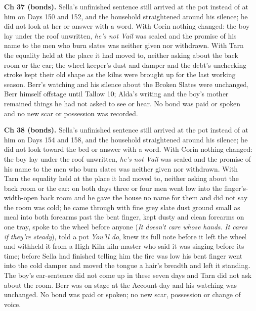 \documentclass{design/chronicle}
\begin{document}
{\textbf{Ch 37 (bonds).} Sella’s unfinished sentence still arrived at the pot instead of at him on Days 150 and 152, and the household straightened around his silence; he did not look at her or answer with a word. With Corin nothing changed: the boy lay under the roof unwritten, \emph{he’s not Vail} was sealed and the promise of his name to the men who burn slates was neither given nor withdrawn. With Tarn the equality held at the place it had moved to, neither asking about the back room or the ear; the wheel-keeper’s dust and damper and the debt’s unchecking stroke kept their old shape as the kilns were brought up for the last working season. Berr’s watching and his silence about the Broken Slates were unchanged, Berr himself offstage until Tallow 10; Alda’s writing and the boy’s mother remained things he had not asked to see or hear. No bond was paid or spoken and no new scar or possession was recorded.

\textbf{Ch 38 (bonds).} Sella’s unfinished sentence still arrived at the pot instead of at him on Days 154 and 158, and the household straightened around his silence; he did not look toward the bed or answer with a word. With Corin nothing changed: the boy lay under the roof unwritten, \emph{he’s not Vail} was sealed and the promise of his name to the men who burn slates was neither given nor withdrawn. With Tarn the equality held at the place it had moved to, neither asking about the back room or the ear: on both days three or four men went low into the finger’s-width-open back room and he gave the house no name for them and did not say the room was cold; he came through with fine grey slate dust ground small as meal into both forearms past the bent finger, kept dusty and clean forearms on one tray, spoke to the wheel before anyone (\emph{It doesn’t care whose hands. It cares if they’re steady}), told a pot \emph{You’ll do}, knew its full note before it left the wheel and withheld it from a High Kiln kiln-master who said it was singing before its time; before Sella had finished telling him the fire was low his bent finger went into the cold damper and moved the tongue a hair’s breadth and left it standing. The boy’s ear-sentence did not come up in these seven days and Tarn did not ask about the room. Berr was on stage at the Account-day and his watching was unchanged. No bond was paid or spoken; no new scar, possession or change of voice.

}
\end{document}
